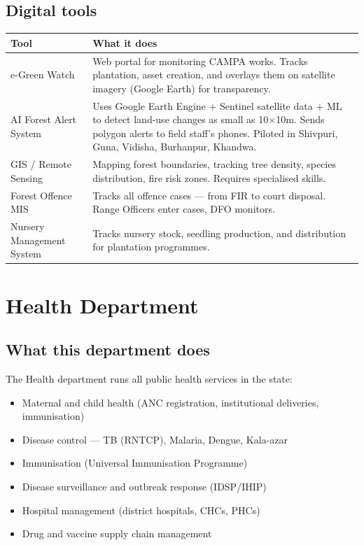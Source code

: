\documentclass[11pt,a4paper]{article}
\begin{document}
\subsection{Digital tools}

\begin{tabularx}{\textwidth}{@{}L{3.5cm} X@{}}
\toprule
\textbf{Tool} & \textbf{What it does} \\
\midrule
e-Green Watch & Web portal for monitoring CAMPA works. Tracks plantation, asset creation, and overlays them on satellite imagery (Google Earth) for transparency. \\
AI Forest Alert System & Uses Google Earth Engine + Sentinel satellite data + ML to detect land-use changes as small as 10$\times$10m. Sends polygon alerts to field staff's phones. Piloted in Shivpuri, Guna, Vidisha, Burhanpur, Khandwa. \\
GIS / Remote Sensing & Mapping forest boundaries, tracking tree density, species distribution, fire risk zones. Requires specialised skills. \\
Forest Offence MIS & Tracks all offence cases --- from FIR to court disposal. Range Officers enter cases, DFO monitors. \\
Nursery Management System & Tracks nursery stock, seedling production, and distribution for plantation programmes. \\
\bottomrule
\end{tabularx}

\newpage
\section{Health Department}

\subsection{What this department does}

The Health department runs all public health services in the state:
\begin{itemize}[nosep]
  \item Maternal and child health (ANC registration, institutional deliveries, immunisation)
  \item Disease control --- TB (RNTCP), Malaria, Dengue, Kala-azar
  \item Immunisation (Universal Immunisation Programme)
  \item Disease surveillance and outbreak response (IDSP/IHIP)
  \item Hospital management (district hospitals, CHCs, PHCs)
  \item Drug and vaccine supply chain management
\end{itemize}
\end{document}
